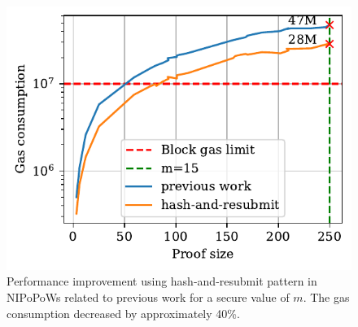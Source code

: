 \begin{figure}[!h]
    \begin{center}
        \includegraphics[width=1\columnwidth]{figures/har-nipopows.pdf}
    \end{center}
    \caption{Performance improvement using hash-and-resubmit pattern in
    NIPoPoWs related to previous work for a secure value of $m$. The gas
    consumption decreased by approximately 40\%.}
    \label{fig:har-nipopow}
\end{figure}
